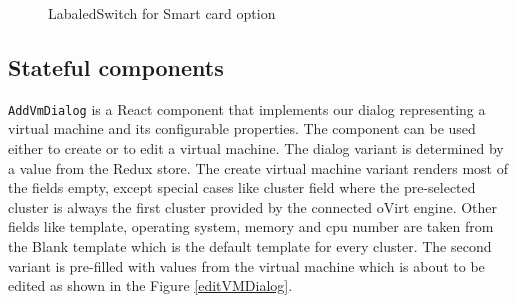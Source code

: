 \begin{figure}[h]
\caption{LabaledSwitch for Smart card option}
\label{switch}
\end{figure}



\subsection{Stateful components}
\texttt{AddVmDialog} is a React component that implements our dialog representing a virtual machine and its configurable properties. The component can be used either to create or to edit a virtual machine. The dialog variant is determined by a value from the Redux store. The create virtual machine variant renders most of the fields empty, except special cases like cluster field where the pre-selected cluster is always the first cluster provided by the connected oVirt engine. Other fields like template, operating system, memory and cpu number are taken from the Blank template which is the default template for every cluster. The second variant is pre-filled with values from the virtual machine which is about to be edited as shown in the Figure \ref{editVMDialog}.

